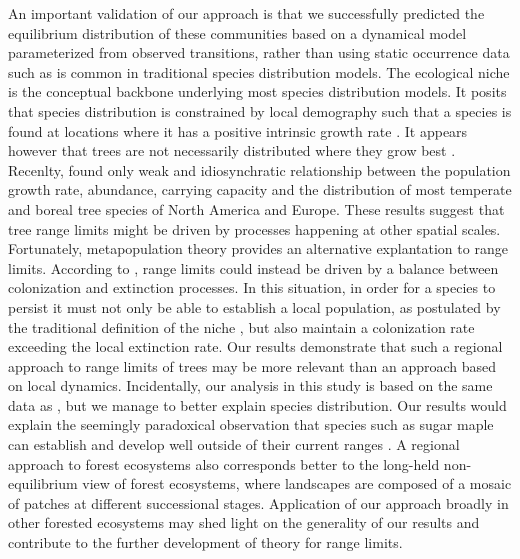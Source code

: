 An important validation of our approach is that we successfully predicted the equilibrium
distribution of these communities based on a dynamical model parameterized from observed
transitions, rather than using static occurrence data such as is common in traditional species
distribution models. The ecological niche is the conceptual backbone underlying most species
distribution models. It posits that species distribution is constrained by local demography such
that a species is found at locations where it has a positive intrinsic growth rate \citep{Holt2009}.
It appears however that trees are not necessarily distributed where they grow best
\citep{McGill2012}. Recenlty, \citet{Thuiller_2014} found only weak and idiosynchratic relationship
between the population growth rate, abundance, carrying capacity and the distribution of most
temperate and boreal tree species of North America and Europe.  These results suggest that tree
range limits might be driven by processes happening at other spatial scales. Fortunately,
metapopulation theory provides an alternative explantation to range limits.  According to
\citet{Holt2005}, range limits could instead be driven by a balance between colonization and
extinction processes.  In this situation, in order for a species to persist it must not only be able
to establish a local population, as postulated by the traditional definition of the niche
\citep{Holt2009}, but also maintain a colonization rate exceeding the local extinction rate. Our
results demonstrate that such a regional approach to range limits of trees may be more relevant than
an approach based on local dynamics. Incidentally, our analysis in this study is based on the same
data as \citet{Thuiller_2014}, but we manage to better explain species distribution.  Our results
would explain the seemingly paradoxical observation that species such as sugar maple can establish
and develop well outside of their current ranges \citep[e.g., in the deep boreal
forest;][]{Kellman2004, Brown2014}. A regional approach to forest ecosystems also corresponds better
to the long-held non-equilibrium view of forest ecosystems, where landscapes are composed of a
mosaic of patches at different successional stages.  Application of our approach broadly in other
forested ecosystems may shed light on the generality of our results and contribute to the further
development of theory for range limits.

